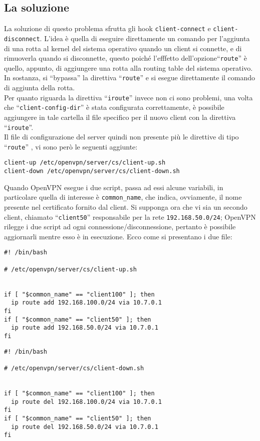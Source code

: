 \subsection{La soluzione}
La soluzione di questo problema sfrutta gli hook \texttt{client-connect} e
\texttt{client-disconnect}. L'idea è
quella di eseguire direttamente un comando per l'aggiunta di una rotta al
kernel del sistema operativo quando un client si connette, e di rimuoverla quando
si disconnette, questo poiché l'efffetto dell'opzione``\texttt{route}'' è quello,
appunto, di aggiungere una rotta alla routing table del sistema operativo. In sostanza,
si ``bypassa'' la direttiva ``\texttt{route}'' e si esegue direttamente il comando
di aggiunta della rotta.\\
Per quanto riguarda la direttiva ``\texttt{iroute}'' invece non ci sono problemi,
una volta che ``\texttt{client-config-dir}'' è stata configurata correttamente, è
possibile aggiungere in tale cartella il file specifico per il nuovo client con la
direttiva ``\texttt{iroute}''.\\
Il file di configurazione del server quindi non presente più le direttive
di tipo ``\texttt{route}'' %
, vi sono però le seguenti aggiunte:
\begin{verbatim}
client-up /etc/openvpn/server/cs/client-up.sh
client-down /etc/openvpn/server/cs/client-down.sh
\end{verbatim}
Quando OpenVPN esegue i due script, passa ad essi alcune variabili, in particolare
quella di interesse è \texttt{common\_name}, che indica, ovviamente, il nome
presente nel certificato fornito dal client. Si supponga ora che vi sia un secondo
client, chiamato ``\texttt{client50}'' responsabile per la rete \texttt{192.168.50.0/24};
OpenVPN rilegge i due script ad ogni connessione/disconnessione, pertanto è possibile
aggiornarli mentre esso è in esecuzione.
Ecco come si presentano i due file:
\begin{verbatim}
#! /bin/bash

# /etc/openvpn/server/cs/client-up.sh


if [ "$common_name" == "client100" ]; then
  ip route add 192.168.100.0/24 via 10.7.0.1
fi
if [ "$common_name" == "client50" ]; then
  ip route add 192.168.50.0/24 via 10.7.0.1
fi
\end{verbatim}
\begin{verbatim}
#! /bin/bash

# /etc/openvpn/server/cs/client-down.sh


if [ "$common_name" == "client100" ]; then
  ip route del 192.168.100.0/24 via 10.7.0.1
fi
if [ "$common_name" == "client50" ]; then
  ip route del 192.168.50.0/24 via 10.7.0.1
fi
\end{verbatim}
